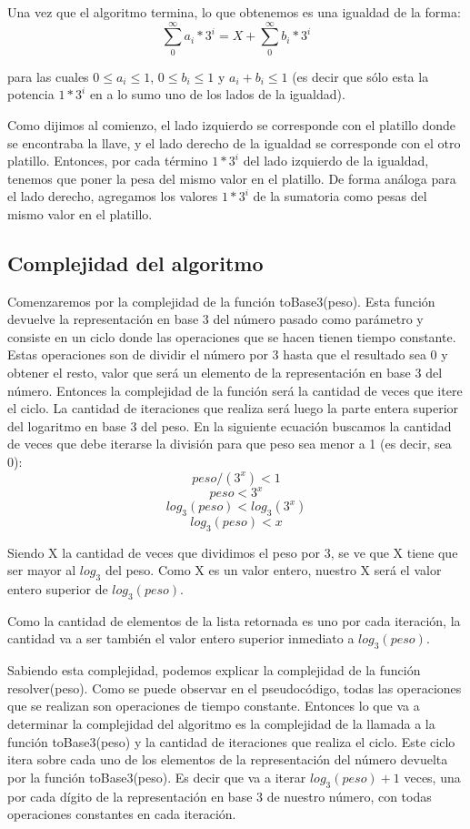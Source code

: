 Una vez que el algoritmo termina, lo que obtenemos es una igualdad de la forma:
\[
\sum_{0}^{\infty}a_i*3^i = X + \sum_{0}^{\infty}b_i*3^i
\]

para las cuales $0 \leq a_i \leq 1$, $0 \leq b_i \leq 1$ y $a_i + b_i \leq 1 $ (es decir que sólo esta la potencia $1*3^i$ en a lo sumo uno de los lados de la igualdad).

Como dijimos al comienzo, el lado izquierdo se corresponde con el platillo donde se encontraba la llave, y el lado derecho de la igualdad se corresponde con el otro platillo. Entonces, por cada término $1*3^i$ del lado izquierdo de la igualdad, tenemos que poner la pesa del mismo valor en el platillo. De forma análoga para el lado derecho, agregamos los valores $1*3^i$ de la sumatoria como pesas del mismo valor en el platillo.

\subsection{Complejidad del algoritmo}

Comenzaremos por la complejidad de la función toBase3(peso). Esta función devuelve la representación en base 3 del número pasado como parámetro y consiste en un ciclo donde las operaciones que se hacen tienen tiempo constante. Estas operaciones son de dividir el número por 3 hasta que el resultado sea 0 y obtener el resto, valor que será un elemento de la representación en base 3 del número. Entonces la complejidad de la función será la cantidad de veces que itere el ciclo. La cantidad de iteraciones que realiza será luego la parte entera superior del logaritmo en base 3 del peso. En la siguiente ecuación buscamos la cantidad de veces que debe iterarse la división para que peso sea menor a 1 (es decir, sea 0):
\[ 
peso/(3^x) < 1 
\] \[
peso < 3^x
\] \[
log_3(peso) < log_3(3^x)
\] \[
log_3(peso) < x
\]

Siendo X la cantidad de veces que dividimos el peso por 3, se ve que X tiene que ser mayor al $log_3$ del peso. Como X es un valor entero, nuestro X será el valor entero superior de $log_3(peso)$.

Como la cantidad de elementos de la lista retornada es uno por cada iteración, la cantidad va a ser también el valor entero superior inmediato a $log_3(peso)$.


Sabiendo esta complejidad, podemos explicar la complejidad de la función resolver(peso). Como se puede observar en el pseudocódigo, todas las operaciones que se realizan son operaciones de tiempo constante. Entonces lo que va a determinar la complejidad del algoritmo es la complejidad de la llamada a la función toBase3(peso) y la cantidad de iteraciones que realiza el ciclo. Este ciclo itera sobre cada uno de los elementos de la representación del número devuelta por la función toBase3(peso). Es decir que va a iterar $log_3(peso) +1$ veces, una por cada dígito de la representación en base 3 de nuestro número, con todas operaciones constantes en cada iteración. 

